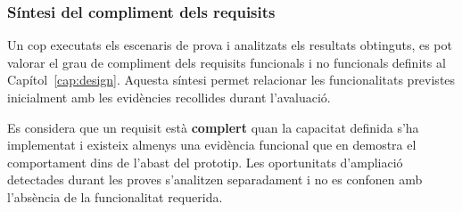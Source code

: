 \subsubsection{Síntesi del compliment dels requisits}
\label{sec:sintesi_requisits}

Un cop executats els escenaris de prova i analitzats els resultats obtinguts, es pot valorar el grau de compliment dels requisits funcionals i no funcionals definits al Capítol~\ref{cap:design}. Aquesta síntesi permet relacionar les funcionalitats previstes inicialment amb les evidències recollides durant l’avaluació.

Es considera que un requisit està \textbf{complert} quan la capacitat definida s'ha implementat i existeix almenys una evidència funcional que en demostra el comportament dins de l'abast del prototip. Les oportunitats d'ampliació detectades durant les proves s'analitzen separadament i no es confonen amb l'absència de la funcionalitat requerida.

